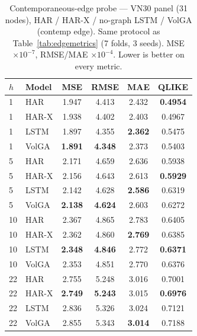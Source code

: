 \documentclass[runningheads]{llncs}
\begin{document}
\begin{table}[t]
\centering
\caption{Contemporaneous-edge probe --- VN30 panel (31 nodes), HAR / HAR-X / no-graph LSTM / VolGA
(contemp edge). Same protocol as Table~\ref{tab:edgemetrics} (7 folds, 3 seeds). MSE $\times10^{-7}$,
RMSE/MAE $\times10^{-4}$. Lower is better on every metric.}
\label{tab:edgemetrics-vn30}
\footnotesize
\setlength{\tabcolsep}{6pt}
\begin{tabular}{llcccc}
\toprule
$h$ & Model & MSE & RMSE & MAE & QLIKE \\
\midrule
1 & HAR   & 1.947 & 4.413 & 2.432 & \textbf{0.4954} \\
1 & HAR-X & 1.938 & 4.402 & 2.403 & 0.4967 \\
1 & LSTM  & 1.897 & 4.355 & \textbf{2.362} & 0.5475 \\
1 & VolGA & \textbf{1.891} & \textbf{4.348} & 2.373 & 0.5403 \\
\midrule
5 & HAR   & 2.171 & 4.659 & 2.636 & 0.5938 \\
5 & HAR-X & 2.156 & 4.643 & 2.613 & \textbf{0.5929} \\
5 & LSTM  & 2.142 & 4.628 & \textbf{2.586} & 0.6319 \\
5 & VolGA & \textbf{2.138} & \textbf{4.624} & 2.603 & 0.6272 \\
\midrule
10 & HAR   & 2.367 & 4.865 & 2.783 & 0.6405 \\
10 & HAR-X & 2.362 & 4.860 & \textbf{2.769} & 0.6385 \\
10 & LSTM  & \textbf{2.348} & \textbf{4.846} & 2.772 & \textbf{0.6371} \\
10 & VolGA & 2.353 & 4.851 & 2.770 & 0.6376 \\
\midrule
22 & HAR   & 2.755 & 5.248 & 3.016 & 0.7001 \\
22 & HAR-X & \textbf{2.749} & \textbf{5.243} & 3.015 & \textbf{0.6976} \\
22 & LSTM  & 2.836 & 5.326 & 3.024 & 0.7121 \\
22 & VolGA & 2.855 & 5.343 & \textbf{3.014} & 0.7188 \\
\bottomrule
\end{tabular}
\end{table}
\end{document}
